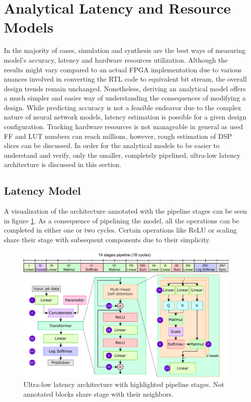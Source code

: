 \section{Analytical Latency and Resource Models}
In the majority of cases, simulation and synthesis are the best ways of measuring model's accuracy, latency and hardware resources utilization. Although the results might vary compared to an actual FPGA implementation due to various nuances involved in converting the RTL code to equivalent bit stream, the overall design trends remain unchanged. Nonetheless, deriving an analytical model offers a much simpler and easier way of understanding the consequences of modifying a design. While predicting accuracy is not a feasible endeavor due to the complex nature of neural network models, latency estimation is possible for a given design configuration. Tracking hardware resources is not manageable in general as used FF and LUT numbers can reach millions, however, rough estimation of DSP slices can be discussed. In order for the analytical models to be easier to understand and verify, only the smaller, completely pipelined, ultra-low latency architecture is discussed in this section.

\subsection{Latency Model}
A visualization of the architecture annotated with the pipeline stages can be seen in figure \ref{fig:pipeline-stages}. As a consequence of pipelining the model, all the operations can be completed in either one or two cycles. Certain operations like ReLU or scaling share their stage with subsequent components due to their simplicity.

\begin{figure}[hpt!]
  \centering
  \includegraphics[trim={0cm 0cm 0cm 0cm}, width=1.0\textwidth, center]{quantization/pipelining_stages.pdf}
  \caption{Ultra-low latency architecture with highlighted pipeline stages. Not annotated blocks share stage with their neighbors.}
  \label{fig:pipeline-stages}
\end{figure}

